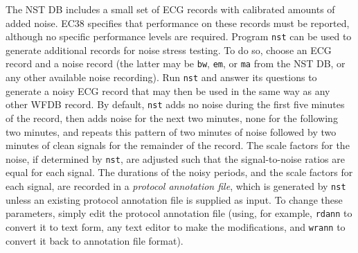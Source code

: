 The NST DB includes a small set of ECG records with calibrated amounts
of added noise.  EC38 specifies that performance on these records must
be reported, although no specific performance levels are required.
Program {\tt nst} can be used to generate additional records for noise
stress testing.  To do so, choose an ECG record and a noise record
(the latter may be {\tt bw}, {\tt em}, or {\tt ma} from the NST DB, or
any other available noise recording).  Run {\tt nst} and answer its
questions to generate a noisy ECG record that may then be used in the
same way as any other WFDB record.  By default, {\tt nst} adds no noise
during the first five minutes of the record, then adds noise for the
next two minutes, none for the following two minutes, and repeats this
pattern of two minutes of noise followed by two minutes of clean
signals for the remainder of the record.  The scale factors for the
noise, if determined by {\tt nst}, are adjusted such that the
signal-to-noise ratios are equal for each signal.  The durations of
the noisy periods, and the scale factors for each signal, are recorded
in a {\em protocol annotation file}, which is generated by {\tt nst}
unless an existing protocol annotation file is supplied as input.  To
change these parameters, simply edit the protocol annotation file
(using, for example, {\tt rdann} to convert it to text form, any text
editor to make the modifications, and {\tt wrann} to convert it back
to annotation file format).

